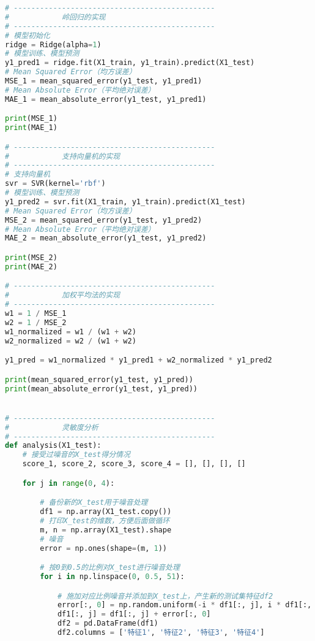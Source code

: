 \begin{lstlisting}[language=Python]
# ----------------------------------------------
#            岭回归的实现
# ----------------------------------------------
# 模型初始化
ridge = Ridge(alpha=1)
# 模型训练、模型预测
y1_pred1 = ridge.fit(X1_train, y1_train).predict(X1_test)
# Mean Squared Error（均方误差）
MSE_1 = mean_squared_error(y1_test, y1_pred1)
# Mean Absolute Error（平均绝对误差）
MAE_1 = mean_absolute_error(y1_test, y1_pred1)

print(MSE_1)
print(MAE_1)

# ----------------------------------------------
#            支持向量机的实现
# ----------------------------------------------
# 支持向量机
svr = SVR(kernel='rbf')
# 模型训练、模型预测
y1_pred2 = svr.fit(X1_train, y1_train).predict(X1_test)
# Mean Squared Error（均方误差）
MSE_2 = mean_squared_error(y1_test, y1_pred2)
# Mean Absolute Error（平均绝对误差）
MAE_2 = mean_absolute_error(y1_test, y1_pred2)

print(MSE_2)
print(MAE_2)

# ----------------------------------------------
#            加权平均法的实现
# ----------------------------------------------
w1 = 1 / MSE_1
w2 = 1 / MSE_2
w1_normalized = w1 / (w1 + w2)
w2_normalized = w2 / (w1 + w2)

y1_pred = w1_normalized * y1_pred1 + w2_normalized * y1_pred2

print(mean_squared_error(y1_test, y1_pred))
print(mean_absolute_error(y1_test, y1_pred))


# ----------------------------------------------
#            灵敏度分析
# ----------------------------------------------
def analysis(X1_test):
    # 接受过噪音的X_test得分情况
    score_1, score_2, score_3, score_4 = [], [], [], []

    for j in range(0, 4):

        # 备份新的X_test用于噪音处理
        df1 = np.array(X1_test.copy())
        # 打印X_test的维数，方便后面做循环
        m, n = np.array(X1_test).shape
        # 噪音
        error = np.ones(shape=(m, 1))

        # 按0到0.5的比例对X_test进行噪音处理
        for i in np.linspace(0, 0.5, 51):

            # 施加对应比例噪音并添加到X_test上，产生新的测试集特征df2
            error[:, 0] = np.random.uniform(-i * df1[:, j], i * df1[:, j])
            df1[:, j] = df1[:, j] + error[:, 0]
            df2 = pd.DataFrame(df1)
            df2.columns = ['特征1', '特征2', '特征3', '特征4']


\end{lstlisting}
